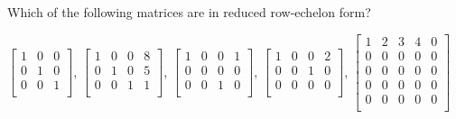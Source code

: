 \documentclass[11pt]{exam}
\begin{document}
\begin{questions}

\addpoints
\question[20]

Which of the following matrices are in reduced row-echelon form?

$
\begin{bmatrix}
1 & 0 & 0 \\
0 & 1 & 0 \\
0 & 0 & 1 \\
\end{bmatrix}
$,
$
\begin{bmatrix}
1 & 0 & 0 & 8\\
0 & 1 & 0 & 5\\
0 & 0 & 1 & 1\\
\end{bmatrix}
$,
$
\begin{bmatrix}
1 & 0 & 0 & 1\\
0 & 0 & 0 & 0\\
0 & 0 & 1 & 0\\
\end{bmatrix}
$,
$
\begin{bmatrix}
1 & 0 & 0 & 2\\
0 & 0 & 1 & 0\\
0 & 0 & 0 & 0\\
\end{bmatrix}
$,
$
\begin{bmatrix}
1 & 2 & 3 & 4 & 0\\
0 & 0 & 0 & 0 & 0\\
0 & 0 & 0 & 0 & 0\\
0 & 0 & 0 & 0 & 0\\
0 & 0 & 0 & 0 & 0\\
\end{bmatrix}
$

\newpage
\addpoints
\question
{}
\end{questions}
\end{document}
